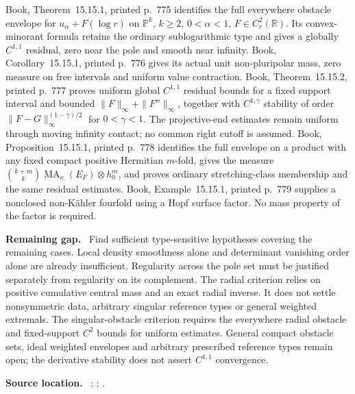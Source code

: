 \documentclass[11pt]{article}
\newcommand{\field}[1]{\par\medskip\noindent\textbf{#1.}\ }
\begin{document}
\par Book, Theorem~15.15.1, printed p.~775 identifies the full everywhere obstacle envelope for $u_\alpha+F(\log r)$ on $\mathbb P^k$, $k\ge2$, $0<\alpha<1$, $F\in C_c^2(\mathbb R)$. Its convex-minorant formula retains the ordinary sublogarithmic type and gives a globally $C^{1,1}$ residual, zero near the pole and smooth near infinity. Book, Corollary~15.15.1, printed p.~776 gives its actual unit non-pluripolar mass, zero measure on free intervals and uniform value contraction. Book, Theorem~15.15.2, printed p.~777 proves uniform global $C^{1,1}$ residual bounds for a fixed support interval and bounded $\|F\|_\infty+\|F''\|_\infty$, together with $C^{1,\gamma}$ stability of order $\|F-G\|_\infty^{(1-\gamma)/2}$ for $0<\gamma<1$. The projective-end estimates remain uniform through moving infinity contact; no common right cutoff is assumed. Book, Proposition~15.15.1, printed p.~778 identifies the full envelope on a product with any fixed compact positive Hermitian $m$-fold, gives the measure $\binom{k+m}{k}\operatorname{MA}_\kappa(E_F)\otimes h_0^m$, and proves ordinary stretching-class membership and the same residual estimates. Book, Example~15.15.1, printed p.~779 supplies a nonclosed non-K\"ahler fourfold using a Hopf surface factor. No mass property of the factor is required.
\field{Remaining gap} Find sufficient type-sensitive hypotheses covering the remaining cases. Local density smoothness alone and determinant vanishing order alone are already insufficient. Regularity across the pole set must be justified separately from regularity on its complement. The radial criterion relies on positive cumulative central mass and an exact radial inverse. It does not settle nonsymmetric data, arbitrary singular reference types or general weighted extremals.
 The singular-obstacle criterion requires the everywhere radial obstacle and fixed-support $C^2$ bounds for uniform estimates. General compact obstacle sets, ideal weighted envelopes and arbitrary prescribed reference types remain open; the derivative stability does not assert $C^{1,1}$ convergence.
\field{Source location} ; ; .
\end{document}
